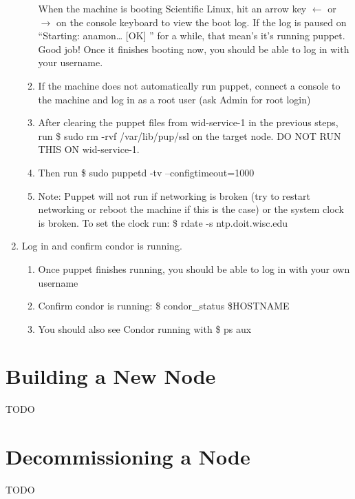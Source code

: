 \documentclass[10pt,letterpaper]{article}
\begin{document}
\begin{enumerate}
\begin{enumerate}
            When the machine is booting Scientific Linux, hit an arrow key
            $\leftarrow$ or $\rightarrow$ on the console keyboard to view the boot
            log. If the log is paused on “{\selectfont Starting:
            anamon…     [OK] }” for a while, that mean’s it’s running puppet. Good
            job! Once it finishes booting now, you should be able to log in with your username.
            \item If the machine does not automatically run puppet, connect a console
            to the machine and log in as a root user (ask Admin for root login)
            \item After clearing the puppet files from wid-service-1 in the previous
            steps, run {\selectfont \$ sudo rm -rvf /var/lib/pup/ssl }
            on the target node. DO NOT RUN THIS ON wid-service-1.
            \item Then run {\selectfont \$ sudo puppetd -tv
            --configtimeout=1000 }
            \item Note: Puppet will not run if networking is broken (try to restart
            networking or reboot the machine if this is the case) or the system
            clock is broken. To set the clock run: {\selectfont
            \$ rdate -s ntp.doit.wisc.edu }
        \end{enumerate}
        \item Log in and confirm condor is running.
            \begin{enumerate}
                \item Once puppet finishes running, you should be able to log in
                with your own username
                \item Confirm condor is running: {\selectfont \$
                condor\_status \$HOSTNAME }
                \item You should also see Condor running with {\selectfont
                \$ ps aux }
            \end{enumerate}
    \end{enumerate}
\clearpage

\section{Building a New Node}
    TODO
\clearpage

\section{Decommissioning a Node}
    TODO
\clearpage
\end{document}
